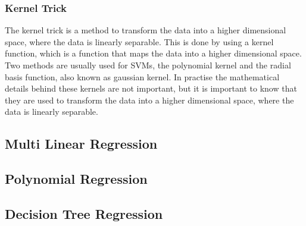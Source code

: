 \subsubsection*{Kernel Trick}

The kernel trick is a method to transform the data into a higher dimensional space, where the
data is linearly
separable.
This is done by using a kernel function, which is a function that maps the data into a higher
dimensional space.
Two methods are usually used for \ac{SVM}s, the polynomial kernel and the radial basis function,
also known as gaussian kernel.
\cite[p. 97-98]{muller_introductionmachinelearning_2016}
In practise the mathematical details behind these kernels are not important, but it is important
to know that they are used to transform the data into a higher dimensional space, where the data
is linearly separable.

\subsection{Multi Linear Regression}\label{subsec:multi-linear-regression}

\subsection{Polynomial Regression}\label{subsec:polynomial-regression}

\subsection{Decision Tree Regression}\label{subsec:decision-tree-regression}


